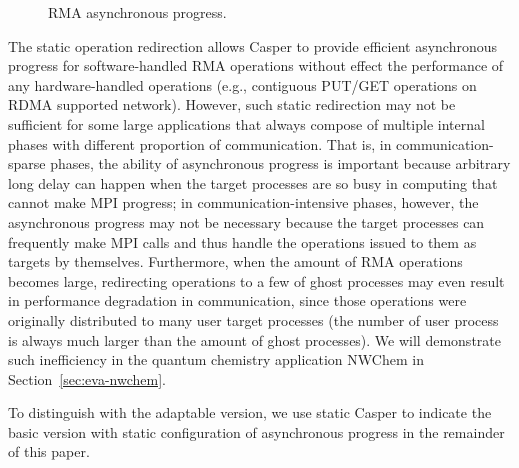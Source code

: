 \begin{figure}
  \hfill
  \vspace{-1.0ex}
  \caption{RMA asynchronous progress.}
  \label{fig:des-casper-async}
  \vspace{-3.0ex}
\end{figure}

The static operation redirection allows Casper to provide efficient
asynchronous progress for software-handled RMA operations without
effect the performance of any hardware-handled operations (e.g., contiguous
PUT/GET operations on RDMA supported network).
However, such static redirection may not be sufficient for some large
applications that always compose of multiple internal phases with
different proportion of communication.
That is, in communication-sparse phases, the ability of asynchronous
progress is important because arbitrary long delay can happen when the
target processes are so busy in computing that cannot make MPI progress;
in communication-intensive phases, however, the asynchronous progress may
not be necessary because the target processes can frequently make MPI calls
and thus handle the operations issued to them as targets by themselves.
Furthermore, when the amount of RMA operations becomes large, redirecting
operations to a few of ghost processes may even result in performance
degradation in communication, since those operations were originally
distributed to many user target processes (the number of user process
is always much larger than the amount of ghost processes). We will
demonstrate such inefficiency in the quantum chemistry application
NWChem in Section~\ref{sec:eva-nwchem}.

To distinguish with the adaptable version, we use static Casper to
indicate the basic version with static configuration of asynchronous
progress in the remainder of this paper.

